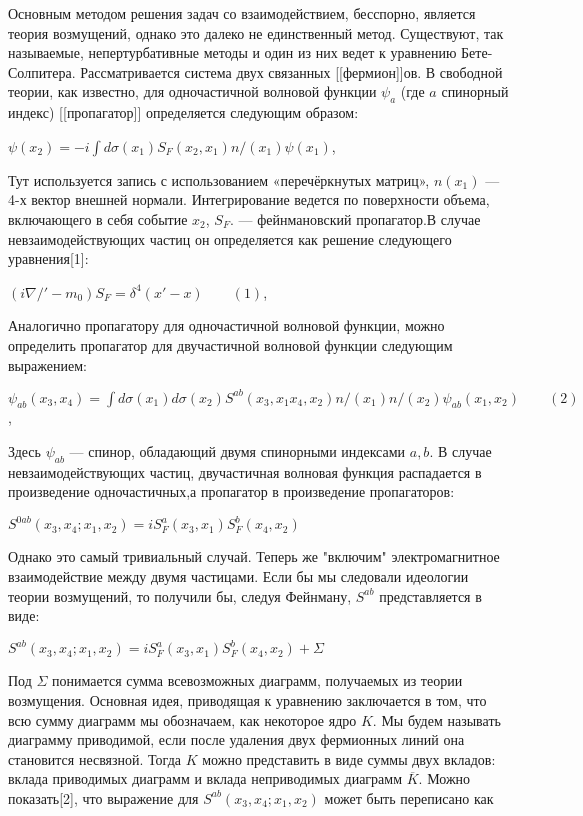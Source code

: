 \documentclass[a4paper,14pt,russian]{article}
\begin{document}
Основным методом решения задач со взаимодействием, бесспорно, является теория возмущений, однако это далеко не единственный метод. Существуют, так называемые, непертурбативные методы и один из них ведет к уравнению Бете-Солпитера. Рассматривается система двух связанных [[фермион]]ов. В свободной теории, как известно, для одночастичной волновой функции $ \psi_{a} $  (где $a$ спинорный индекс) [[пропагатор]] определяется следующим образом:

$ \psi(x_{2})=-i\int{d\sigma{(x_{1})}S_{F}{(x_{2},x_{1})}n\!\!\!/(x_{1})\psi(x_{1})} $,

Тут используется запись с использованием «перечёркнутых матриц», $ n(x_{1}) $ — 4-х вектор внешней нормали. Интегрирование ведется по поверхности объема, включающего в себя событие $ x_{2} $, $ S_{F} $. — фейнмановский пропагатор.В случае невзаимодействующих частиц он определяется как решение следующего уравнения[1]:

$ (i\nabla\!\!\!/'-m_{0})S_{F}=\delta^{4}(x'-x)\qquad ( 1 ) $,

Аналогично пропагатору для одночастичной волновой функции, можно определить пропагатор для двучастичной волновой функции следующим выражением:

$ \psi_{ab}(x_{3},x_{4})=\int{d\sigma{(x_{1})}d\sigma{(x_{2})}S^{ab}{(x_{3},x_{1}x_{4},x_{2})}n\!\!\!/(x_{1})n\!\!\!/(x_{2})\psi_{ab}(x_{1},x_{2})} \qquad ( 2 ) $,

Здесь $ \psi_{ab} $  — спинор, обладающий двумя спинорными индексами $ a,b $. В случае невзаимодействующих частиц, двучастичная волновая функция распадается в произведение одночастичных,а пропагатор в произведение пропагаторов:

$ S^{0ab}(x_{3},x_{4};x_{1},x_{2})=iS_{F}^{a}(x_{3},x_{1})S_{F}^{b}(x_{4},x_{2}) $

Однако это самый тривиальный случай. Теперь же "включим" электромагнитное взаимодействие между двумя частицами. Если бы мы следовали идеологии теории возмущений, то получили бы, следуя Фейнману, $ S^{ab} $ представляется в виде:

$ S^{ab}(x_{3},x_{4};x_{1},x_{2})=iS_{F}^{a}(x_{3},x_{1})S_{F}^{b}(x_{4},x_{2})+\Sigma $

Под $ \Sigma $  понимается сумма всевозможных диаграмм, получаемых из теории возмущения. Основная идея, приводящая к уравнению заключается в том, что всю сумму диаграмм мы обозначаем, как некоторое ядро $ K $. Мы будем называть диаграмму приводимой, если  после удаления двух фермионных линий она становится несвязной. Тогда $ K $ можно представить в виде суммы двух вкладов: вклада приводимых диаграмм и вклада неприводимых диаграмм $ \overline{K} $. Можно показать[2], что выражение для $ S^{ab}(x_{3},x_{4};x_{1},x_{2}) $  может быть переписано как
\end{document}
